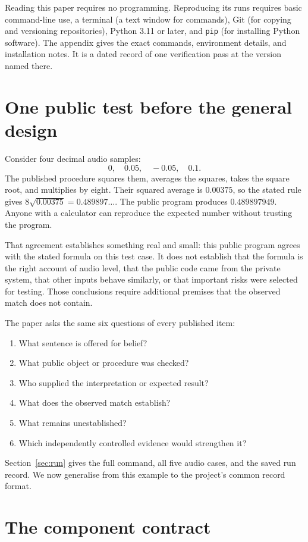 \documentclass[11pt]{article}
\newcommand{\code}[1]{\texttt{#1}}
\begin{document}
Reading this paper requires no programming. Reproducing its runs requires
basic command-line use, a terminal (a text window for commands), Git (for
copying and versioning repositories), Python 3.11 or later, and \code{pip}
(for installing Python software). The appendix gives the exact commands,
environment details, and installation notes. It is a dated record of one
verification pass at the version named there.

\section{One public test before the general design}
\label{sec:early-example}

Consider four decimal audio samples:
\[
0,\quad 0.05,\quad -0.05,\quad 0.1.
\]
The published procedure squares them, averages the squares, takes the square
root, and multiplies by eight.  Their squared average is \(0.00375\), so the
stated rule gives \(8\sqrt{0.00375}=0.489897\ldots\).  The public program
produces \(0.489897949\).  Anyone with a calculator can reproduce the expected
number without trusting the program.

That agreement establishes something real and small: this public program
agrees with the stated formula on this test case.  It does not establish that
the formula is the right account of audio level, that the public code came
from the private system, that other inputs behave similarly, or that important
risks were selected for testing.  Those conclusions require additional
premises that the observed match does not contain.

The paper asks the same six questions of every published item:
\begin{enumerate}
\item What sentence is offered for belief?
\item What public object or procedure was checked?
\item Who supplied the interpretation or expected result?
\item What does the observed match establish?
\item What remains unestablished?
\item Which independently controlled evidence would strengthen it?
\end{enumerate}
Section~\ref{sec:run} gives the full command, all five audio cases, and the
saved run record.  We now generalise from this example to the project's common
record format.

\section{The component contract}
\label{sec:contract}
\end{document}
